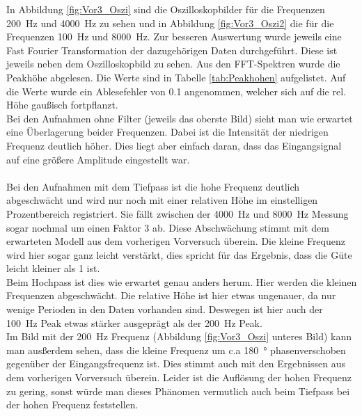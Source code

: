 \documentclass[12pt,a4paper]{article}
\begin{document}
In Abbildung \ref{fig:Vor3_Oszi} sind die Oszilloskopbilder für die Frequenzen \SI{200}{Hz} und \SI{4000}{Hz} zu sehen und in Abbildung \ref{fig:Vor3_Oszi2} die für die Frequenzen \SI{100}{Hz} und \SI{8000}{Hz}. Zur besseren Auswertung wurde jeweils eine Fast Fourier Transformation der dazugehörigen Daten durchgeführt. Diese ist jeweils neben dem Oszilloskopbild zu sehen. Aus den FFT-Spektren wurde die Peakhöhe abgelesen. Die Werte sind in Tabelle \ref{tab:Peakhohen} aufgelistet. Auf die Werte wurde ein Ablesefehler von 0.1 angenommen, welcher sich auf die rel. Höhe gaußisch fortpflanzt. 
\\
Bei den Aufnahmen ohne Filter (jeweils das oberste Bild) sieht man wie erwartet eine Überlagerung beider Frequenzen. Dabei ist die Intensität der niedrigen Frequenz deutlich höher. Dies liegt aber einfach daran, dass das Eingangsignal auf eine größere Amplitude eingestellt war.\\
\\
Bei den Aufnahmen mit dem Tiefpass ist die hohe Frequenz deutlich abgeschwächt und wird nur noch mit einer relativen Höhe im einstelligen Prozentbereich registriert. Sie fällt zwischen der \SI{4000}{Hz} und \SI{8000}{Hz} Messung sogar nochmal um einen Faktor 3 ab. Diese Abschwächung stimmt mit dem erwarteten Modell aus dem vorherigen Vorversuch überein. Die kleine Frequenz wird hier sogar ganz leicht verstärkt, dies spricht für das Ergebnis, dass die Güte leicht kleiner als 1 ist.
\\
Beim Hochpass ist dies wie erwartet genau anders herum. Hier werden die kleinen Frequenzen abgeschwächt. Die relative Höhe ist hier etwas ungenauer, da nur wenige Perioden in den Daten vorhanden sind. Deswegen ist hier auch der \SI{100}{Hz} Peak etwas stärker ausgeprägt als der \SI{200}{Hz} Peak.\\
Im Bild mit der \SI{200}{Hz} Frequenz (Abbildung \ref{fig:Vor3_Oszi} unteres Bild) kann man ausßerdem sehen, dass die kleine Frequenz um c.a \SI{180}{\degree} phasenverschoben gegenüber der Eingangsfrequenz ist. Dies stimmt auch mit den Ergebnissen aus dem vorherigen Vorversuch überein. Leider ist die Auflösung der hohen Frequenz zu gering, sonst würde man dieses Phänomen vermutlich auch beim Tiefpass bei der hohen Frequenz feststellen. 
\end{document}

